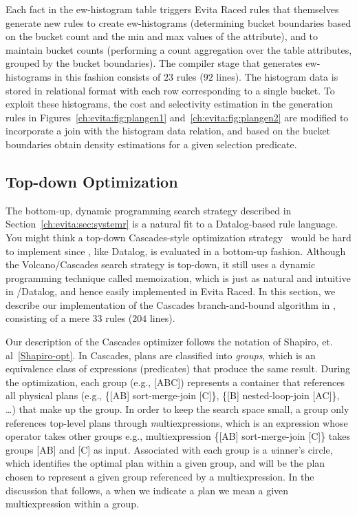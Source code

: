 Each fact in the ew-histogram table triggers Evita Raced rules that themselves generate
new rules to create ew-histograms (determining bucket boundaries based on the bucket
count and the min and max values of the attribute), and to maintain bucket counts (performing
a count aggregation over the table attributes, grouped by the bucket boundaries). The compiler
stage that generates ew-histograms in this fashion consists of $23$ rules ($92$ lines). The 
histogram data is stored in relational format with each row corresponding to a single bucket.
To exploit these histograms, the cost and selectivity estimation in the  generation rules
in Figures~\ref{ch:evita:fig:plangen1} and~\ref{ch:evita:fig:plangen2} are modified to incorporate
a join with the histogram data relation, and based on the bucket boundaries obtain density 
estimations for a given selection predicate.

\subsection{Top-down Optimization}
\label{ch:evita:sec:cascades}

The bottom-up, dynamic programming search strategy described in
Section~\ref{ch:evita:sec:systemr} is a natural fit to a Datalog-based rule
language.  You might think a top-down Cascades-style optimization
strategy~\cite{cascades} would be hard to implement since \OVERLOG, like
Datalog, is evaluated in a bottom-up fashion.  Although the Volcano/Cascades
search strategy is top-down, it still uses a dynamic programming technique
called memoization, which is just as natural and intuitive in \OVERLOG/Datalog,
and hence easily implemented in Evita Raced.  In this section, we describe our
implementation of the Cascades branch-and-bound algorithm in \OVERLOG,
consisting of a mere $33$ rules ($204$ lines).

Our description of the Cascades optimizer follows the notation of Shapiro, et.
al~\ref{Shapiro-opt}.  In Cascades, plans are classified into {\em groups},
which is an equivalence class of expressions (predicates) that produce the same
result.  During the optimization, each group (e.g., [ABC]) represents a
container that references all physical plans (e.g., \{[AB] sort-merge-join [C]\},
\{[B] nested-loop-join [AC]\}, \ldots) that make up the group.  In order to keep
the search space small, a group only references top-level plans through {\emph
multiexpressions}, which is an expression whose operator takes other groups
e.g., multiexpression \{[AB] sort-merge-join [C]\} takes groups [AB] and [C] as
input.  Associated with each group is a {\emph winner's circle}, which
identifies the optimal plan within a given group, and will be the plan chosen
to represent a given group referenced by a multiexpression.  In the discussion
that follows, a when we indicate a {\emph plan} we mean a given multiexpression within a group.

